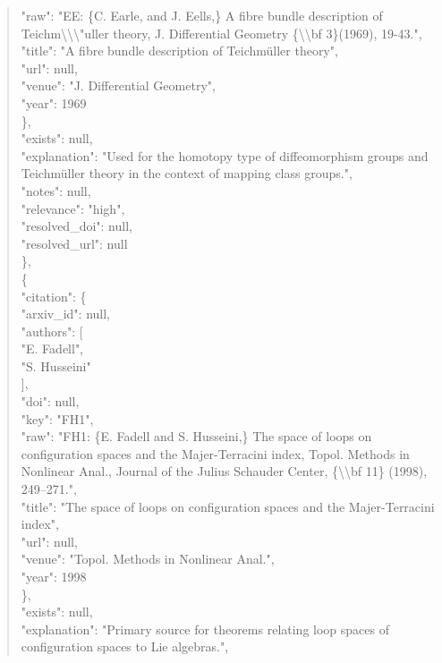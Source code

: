\documentclass[11pt]{article}
\begin{document}
\begin{quote}
        "raw": "EE: \{C. Earle, and J. Eells,\} A fibre bundle description of Teichm\textbackslash{}\textbackslash{}\textbackslash{}"uller theory, J. Differential Geometry \{\textbackslash{}\textbackslash{}bf 3\}(1969), 19-43.",\\
        "title": "A fibre bundle description of Teichmüller theory",\\
        "url": null,\\
        "venue": "J. Differential Geometry",\\
        "year": 1969\\
      \},\\
      "exists": null,\\
      "explanation": "Used for the homotopy type of diffeomorphism groups and Teichmüller theory in the context of mapping class groups.",\\
      "notes": null,\\
      "relevance": "high",\\
      "resolved\_doi": null,\\
      "resolved\_url": null\\
    \},\\
    \{\\
      "citation": \{\\
        "arxiv\_id": null,\\
        "authors": [\\
          "E. Fadell",\\
          "S. Husseini"\\
        ],\\
        "doi": null,\\
        "key": "FH1",\\
        "raw": "FH1: \{E. Fadell and S. Husseini,\} The space of loops on configuration spaces and the Majer-Terracini index, Topol. Methods in Nonlinear Anal., Journal of the Julius Schauder Center, \{\textbackslash{}\textbackslash{}bf 11\} (1998), 249--271.",\\
        "title": "The space of loops on configuration spaces and the Majer-Terracini index",\\
        "url": null,\\
        "venue": "Topol. Methods in Nonlinear Anal.",\\
        "year": 1998\\
      \},\\
      "exists": null,\\
      "explanation": "Primary source for theorems relating loop spaces of configuration spaces to Lie algebras.",\\

\end{quote}
\end{document}
